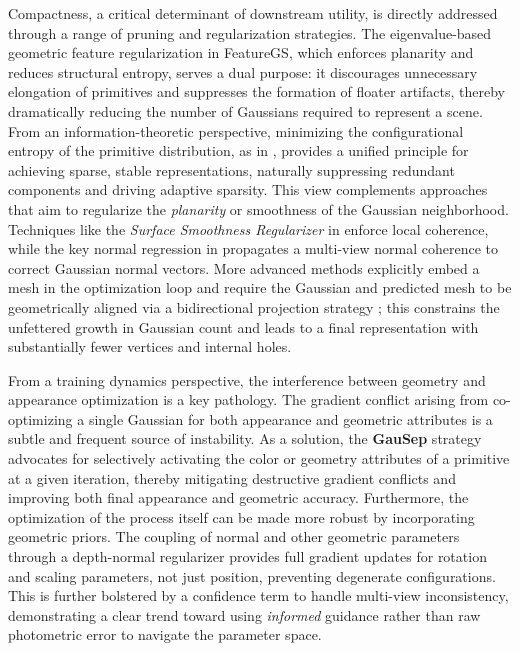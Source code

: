 \documentclass[11pt,a4paper]{article}
\begin{document}
Compactness, a critical determinant of downstream utility, is directly addressed through a range of pruning and regularization strategies. The eigenvalue-based geometric feature regularization in FeatureGS, which enforces planarity and reduces structural entropy, serves a dual purpose: it discourages unnecessary elongation of primitives and suppresses the formation of floater artifacts, thereby dramatically reducing the number of Gaussians required to represent a scene. From an information-theoretic perspective, minimizing the configurational entropy of the primitive distribution, as in \cite{arxiv:2512.04542v1}, provides a unified principle for achieving sparse, stable representations, naturally suppressing redundant components and driving adaptive sparsity. This view complements approaches that aim to regularize the \emph{planarity} or smoothness of the Gaussian neighborhood. Techniques like the \emph{Surface Smoothness Regularizer} in \cite{arxiv:2403.17822v1} enforce local coherence, while the key normal regression in \cite{arxiv:2411.19454v2} propagates a multi-view normal coherence to correct Gaussian normal vectors. More advanced methods explicitly embed a mesh in the optimization loop and require the Gaussian and predicted mesh to be geometrically aligned via a bidirectional projection strategy \cite{arxiv:2506.24096v2}; this constrains the unfettered growth in Gaussian count and leads to a final representation with substantially fewer vertices and internal holes.

From a training dynamics perspective, the interference between geometry and appearance optimization is a key pathology. The gradient conflict arising from co-optimizing a single Gaussian for both appearance and geometric attributes is a subtle and frequent source of instability. As a solution, the \textbf{GauSep} strategy \cite{arxiv:2509.12742v4} advocates for selectively activating the color or geometry attributes of a primitive at a given iteration, thereby mitigating destructive gradient conflicts and improving both final appearance and geometric accuracy. Furthermore, the optimization of the process itself can be made more robust by incorporating geometric priors. The coupling of normal and other geometric parameters through a depth-normal regularizer \cite{arxiv:2406.01467v2} provides full gradient updates for rotation and scaling parameters, not just position, preventing degenerate configurations. This is further bolstered by a confidence term to handle multi-view inconsistency, demonstrating a clear trend toward using \emph{informed} guidance rather than raw photometric error to navigate the parameter space.
\end{document}
